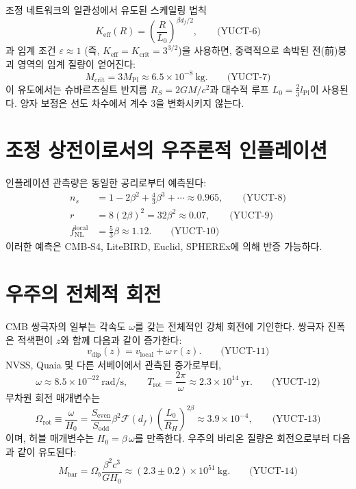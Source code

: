 \documentclass[12pt,a4paper]{article}
\newcommand{\Keff}{K_{\mathrm{eff}}}
\newcommand{\betaf}{\beta}
\newcommand{\Lpl}{l_{\mathrm{Pl}}}
\newcommand{\Sodd}{S_{\mathrm{odd}}}
\newcommand{\Seven}{S_{\mathrm{even}}}
\newcommand{\Lzero}{L_0}
\newcommand{\Mbar}{M_{\mathrm{bar}}}
\begin{document}
	조정 네트워크의 일관성에서 유도된 스케일링 법칙
	\[
	\Keff(R) = \left(\frac{R}{\Lzero}\right)^{\betaf d_f/2}, \qquad\text{(YUCT-6)}
	\]
	과 임계 조건 \(\varepsilon \approx 1\) (즉, \(\Keff = K_{\mathrm{crit}} = 3^{3/2}\))을 사용하면, 중력적으로 속박된 전(前)붕괴 영역의 임계 질량이 얻어진다:
	\[
	M_{\mathrm{crit}} = 3 M_{\mathrm{Pl}} \approx 6.5\times 10^{-8}\ \mathrm{kg}. \qquad\text{(YUCT-7)}
	\]
	이 유도에서는 슈바르츠실트 반지름 \(R_S = 2GM/c^2\)과 대수적 루프 \(\Lzero = \frac{2}{3}\Lpl\)이 사용된다. 양자 보정은 선도 차수에서 계수 3을 변화시키지 않는다.
	
	\section{조정 상전이로서의 우주론적 인플레이션}
	
	인플레이션 관측량은 동일한 공리로부터 예측된다:
	\begin{align}
		n_s &= 1 - 2\betaf^2 + \frac{4}{3}\betaf^3 + \cdots \approx 0.965, \qquad\text{(YUCT-8)}\\
		r &= 8(2\betaf)^2 = 32\betaf^2 \approx 0.07, \qquad\text{(YUCT-9)}\\
		f_{\mathrm{NL}}^{\mathrm{local}} &= \frac{5}{3}\betaf \approx 1.12. \qquad\text{(YUCT-10)}
	\end{align}
	이러한 예측은 CMB‑S4, LiteBIRD, Euclid, SPHEREx에 의해 반증 가능하다.
	
	\section{우주의 전체적 회전}
	
	CMB 쌍극자의 일부는 각속도 \(\omega\)를 갖는 전체적인 강체 회전에 기인한다. 쌍극자 진폭은 적색편이 \(z\)와 함께 다음과 같이 증가한다:
	\[
	v_{\mathrm{dip}}(z) = v_{\mathrm{local}} + \omega\, r(z). \qquad\text{(YUCT-11)}
	\]
	NVSS, Quaia 및 다른 서베이에서 관측된 증가로부터,
	\[
	\omega \approx 8.5\times 10^{-22}\ \mathrm{rad/s},\qquad
	T_{\mathrm{rot}} = \frac{2\pi}{\omega} \approx 2.3\times 10^{14}\ \mathrm{yr}. \qquad\text{(YUCT-12)}
	\]
	무차원 회전 매개변수는
	\[
	\Omega_{\mathrm{rot}} \equiv \frac{\omega}{H_0} = \frac{\Seven}{\Sodd} \betaf^2 \mathcal{F}(d_f)\left(\frac{L_0}{R_H}\right)^{2\betaf} \approx 3.9\times 10^{-4}, \qquad\text{(YUCT-13)}
	\]
	이며, 허블 매개변수는 \(H_0 = \betaf\,\omega\)를 만족한다. 우주의 바리온 질량은 회전으로부터 다음과 같이 유도된다:
	\[
	\Mbar = \Omega_b\frac{\betaf^2 c^3}{G H_0} \approx (2.3\pm 0.2)\times 10^{51}\ \mathrm{kg}. \qquad\text{(YUCT-14)}
	\]
	
\end{document}
